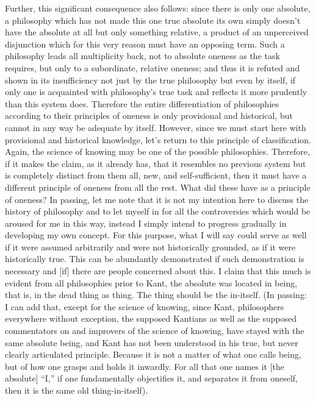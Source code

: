 Further, this significant consequence also follows:
since there is only one absolute, a philosophy which has not
made this one true absolute its own simply doesn't have
the absolute at all but only something relative,
a product of an unperceived disjunction which for this very reason
must have an opposing term.
Such a philosophy leads all multiplicity back, not to absolute oneness as
the task requires, but only to a subordinate, relative oneness;
and thus it is refuted and shown in its insufficiency
not just by the true philosophy but even by itself,
if only one is acquainted with philosophy's true task and
reflects it more prudently than this system does.
Therefore the entire differentiation of philosophies according to
their principles of oneness is only provisional and historical,
but cannot in any way be adequate by itself.
However, since we must start here with provisional and historical knowledge,
let's return to this principle of classification.
Again, the science of knowing may be one of the possible philosophies.
Therefore, if it makes the claim, as it already has,
that it resembles no previous system but is
completely distinct from them all, new, and self-sufficient,
then it must have a different principle of oneness from all the rest.
What did these have as a principle of oneness?
In passing, let me note that it is not my intention here
to discuss the history of philosophy and to let myself in
for all the controversies which would be aroused for me in this way,
instead I simply intend to progress gradually in developing my own concept.
For this purpose, what I will say could serve as well
if it were assumed arbitrarily and were not historically grounded,
as if it were historically true.
This can be abundantly demonstrated if such demonstration is necessary
and [if] there are people concerned about this.
I claim that this much is evident from all
philosophies prior to Kant,
the absolute was located in being, that is,
in the dead thing as thing.
The thing should be the in-itself.
(In passing: I can add that, except for the science of knowing,
since Kant, philosophers everywhere without exception,
the supposed Kantians as well as the supposed
commentators on and improvers of the science of knowing,
have stayed with the same absolute being,
and Kant has not been understood in his true,
but never clearly articulated principle.
Because it is not a matter of what one calls being,
but of how one grasps and holds it inwardly.
For all that one names it [the absolute] “I,”
if one fundamentally objectifies it,
and separates it from oneself,
then it is the same old thing-in-itself).
